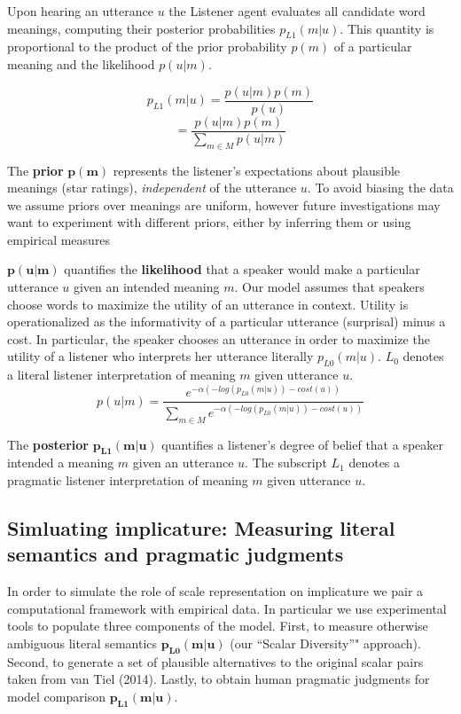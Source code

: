 \documentclass[10pt, letterpaper]{article}
\begin{document}
Upon hearing an utterance \(u\) the Listener agent evaluates all
candidate word meanings, computing their posterior probabilities
\(p_{L1}(m | u)\). This quantity is proportional to the product of the
prior probability \(p(m)\) of a particular meaning and the likelihood
\(p(u | m)\).

\[p_{L1}(m | u) = \frac{p(u | m)p(m)}{p(u)}\]
\[= \frac{p(u | m)p(m)}{\sum_{m \in M}p(u | m)}\]

The \textbf{prior} \(\mathbf{p(m)}\) represents the listener's
expectations about plausible meanings (star ratings), \emph{independent}
of the utterance \(u\). To avoid biasing the data we assume priors over
meanings are uniform, however future investigations may want to
experiment with different priors, either by inferring them or using
empirical measures

\(\mathbf{p(u | m)}\) quantifies the \textbf{likelihood} that a speaker
would make a particular utterance \(u\) given an intended meaning \(m\).
Our model assumes that speakers choose words to maximize the utility of
an utterance in context. Utility is operationalized as the informativity
of a particular utterance (surprisal) minus a cost. In particular, the
speaker chooses an utterance in order to maximize the utility of a
listener who interprets her utterance literally \(p_{L0}(m|u)\). \(L_0\)
denotes a literal listener interpretation of meaning \(m\) given
utterance \(u\).
\[p(u | m) = \frac{e^{-\alpha(-log(p_{L0}(m|u)) - cost(u))}}{\sum_{m \in M}e^{-\alpha(-log(p_{L0}(m|u)) - cost(u))}}\]

The \textbf{posterior} \(\mathbf{p_{L1}(m | u)}\) quantifies a
listener's degree of belief that a speaker intended a meaning \(m\)
given an utterance \(u\). The subscript \(L_1\) denotes a pragmatic
listener interpretation of meaning \(m\) given utterance \(u\).

\subsection{Simluating implicature: Measuring literal semantics and
pragmatic
judgments}\label{simluating-implicature-measuring-literal-semantics-and-pragmatic-judgments}

In order to simulate the role of scale representation on implicature we
pair a computational framework with empirical data. In particular we use
experimental tools to populate three components of the model. First, to
measure otherwise ambiguous literal semantics \(\mathbf{p_{L0}(m|u)}\)
(our ``Scalar Diversity''" approach). Second, to generate a set of
plausible alternatives to the original scalar pairs taken from van Tiel
(2014). Lastly, to obtain human pragmatic judgments for model comparison
\(\mathbf{p_{L1}(m|u)}\).
\end{document}
